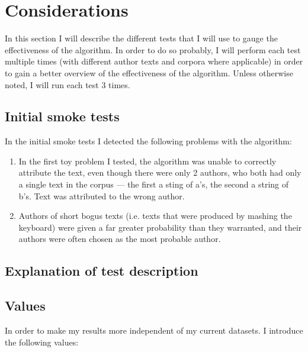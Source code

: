 \section{Considerations}
\label{considerations}

In this section I will describe the different tests that I will use to gauge the effectiveness of the algorithm. In order to do so probably, I will perform each test multiple times (with different author texts and corpora where applicable) in order to gain a better overview of the effectiveness of the algorithm. Unless otherwise noted, I  will run each test 3 times.

\subsection{Initial smoke tests}
\label{smokeTest}
In the initial smoke tests I detected the following problems with the algorithm:
\begin{enumerate}
\item In the first toy problem I tested, the algorithm was unable to correctly attribute the text, even though there were only 2 authors, who both had only a single text in the corpus --- the first a sting of a's, the second a string of b's. Text was attributed to the wrong author.

\item Authors of short bogus texts (i.e. texts that were produced by mashing the keyboard) were given a far greater probability than they warranted, and their authors were often chosen as the most probable author. 
\end{enumerate}
 

\subsection{Explanation of test description}

\subsection{Values}
In order to make my results more independent of my current datasets. I introduce the following values:

